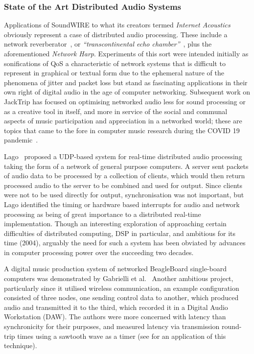 \subsubsection{State of the Art Distributed Audio Systems}

Applications of SoundWIRE to what its creators termed \textit{Internet
Acoustics}~\citep{chafe_physical_2002} obviously represent a case of distributed
audio processing.
These include a network reverberator~\citep{chafe_i_2018}, or
\textit{``transcontinental echo chamber''}~\citep{chafe_simplified_2000},
plus the aforementioned \textit{Network Harp}.
Experiments of this sort were intended initially as sonifications of QoS
\textemdash{} a characteristic of network systems that is difficult to represent
in graphical or textual form due to the ephemeral nature of the phenomena of
jitter and packet loss \textemdash{} but stand as fascinating applications in
their own right of digital audio in the age of computer networking.
Subsequent work on JackTrip has focused on optimising networked audio less
for sound processing or as a creative tool in itself, and more in service of
the social and communal aspects of music participation and appreciation in a
networked world;
these are topics that came to the fore in computer music research during the
COVID 19 pandemic~\citep{bosi_experiencing_2021,sacchetto_jacktrip-webrtc_2021}.

Lago~\citep{lago_distributed_2004} proposed a UDP-based system for real-time
distributed audio processing taking the form of a network of general purpose
computers.
A server sent packets of audio data to be processed by a collection of
clients, which would then return processed audio to the server to be combined
and used for output.
Since clients were not to be used directly for output, synchronisation was not
important, but Lago identified the timing or hardware based interrupts for
audio and network processing as being of great importance to a distributed
real-time implementation.
Though an interesting exploration of approaching certain difficulties of
distributed computing, DSP in particular, and ambitious for its time (2004),
arguably the need for such a system has been obviated by advances in computer
processing power over the succeeding two decades.

A digital music production system of networked BeagleBoard single-board
computers was demonstrated by Gabrielli et al.~\citep{gabrielli_networked_2012}
Another ambitious project, particularly since it utilised wireless
communication, an example configuration consisted of three nodes, one sending
control data to another, which produced audio and transmitted it to the third,
which recorded it in a Digital Audio Workstation (DAW).
The authors were more concerned with latency than synchronicity for their
purposes, and measured latency via transmission round-trip times using a
sawtooth wave as a timer (see  for an
application of this technique).

